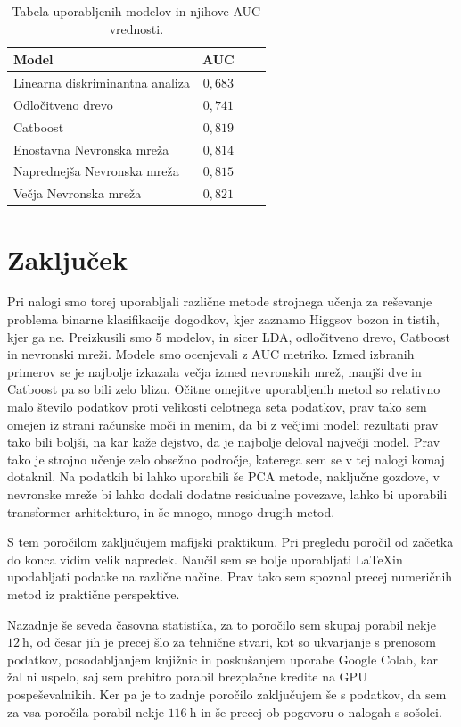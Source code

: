 \documentclass[notoc]{porocilo}
\begin{document}
\begin{table}
    \centering
    \caption{\label{tab:models} Tabela uporabljenih modelov in njihove AUC vrednosti.}
    \begin{tabular}{l c c c}
        Model                           & AUC     \\
        \hline
        Linearna diskriminantna analiza & $0,683$ \\
        Odločitveno drevo               & $0,741$ \\
        Catboost                        & $0,819$ \\
        Enostavna Nevronska mreža       & $0,814$ \\
        Naprednejša Nevronska mreža     & $0,815$ \\
        Večja Nevronska mreža           & $0,821$
    \end{tabular}
\end{table}

\section{Zaključek}
Pri nalogi smo torej uporabljali različne metode strojnega učenja za reševanje problema binarne klasifikacije dogodkov, kjer zaznamo Higgsov bozon in tistih, kjer ga ne. Preizkusili smo 5 modelov, in sicer LDA, odločitveno drevo, Catboost in nevronski mreži. Modele smo ocenjevali z AUC metriko. Izmed izbranih primerov se je najbolje izkazala večja izmed nevronskih mrež, manjši dve in Catboost pa so bili zelo blizu. Očitne omejitve uporabljenih metod so relativno malo število podatkov proti velikosti celotnega seta podatkov, prav tako sem omejen iz strani računske moči in menim, da bi z večjimi modeli rezultati prav tako bili boljši, na kar kaže dejstvo, da je najbolje deloval največji model. Prav tako je strojno učenje zelo obsežno področje, katerega sem se v tej nalogi komaj dotaknil. Na podatkih bi lahko uporabili še PCA metode, naključne gozdove, v nevronske mreže bi lahko dodali dodatne residualne povezave, lahko bi uporabili transformer arhitekturo, in še mnogo, mnogo drugih metod.

S tem poročilom zaključujem mafijski praktikum. Pri pregledu poročil od začetka do konca vidim velik napredek. Naučil sem se bolje uporabljati \LaTeX in upodabljati podatke na različne načine. Prav tako sem spoznal precej numeričnih metod iz praktične perspektive.

Nazadnje še seveda časovna statistika, za to poročilo sem skupaj porabil nekje $\SI{12}{\hour}$, od česar jih je precej šlo za tehnične stvari, kot so ukvarjanje s prenosom podatkov, posodabljanjem knjižnic in poskušanjem uporabe Google Colab, kar žal ni uspelo, saj sem prehitro porabil brezplačne kredite na GPU pospeševalnikih. Ker pa je to zadnje poročilo zaključujem še s podatkov, da sem za vsa poročila porabil nekje $\SI{116}{\hour}$ in še precej ob pogovoru o nalogah s sošolci.
\end{document}
